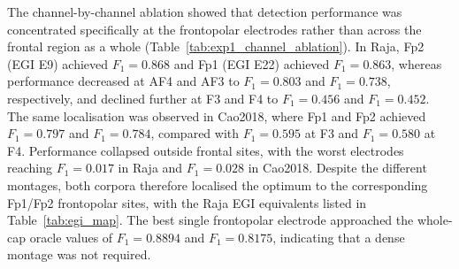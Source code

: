 The channel-by-channel ablation showed that detection performance was concentrated specifically at the frontopolar electrodes rather than across the frontal region as a whole (Table~\ref{tab:exp1_channel_ablation}). In Raja, Fp2 (EGI E9) achieved $F_1=0.868$ and Fp1 (EGI E22) achieved $F_1=0.863$, whereas performance decreased at AF4 and AF3 to $F_1=0.803$ and $F_1=0.738$, respectively, and declined further at F3 and F4 to $F_1=0.456$ and $F_1=0.452$. The same localisation was observed in Cao2018, where Fp1 and Fp2 achieved $F_1=0.797$ and $F_1=0.784$, compared with $F_1=0.595$ at F3 and $F_1=0.580$ at F4. Performance collapsed outside frontal sites, with the worst electrodes reaching $F_1=0.017$ in Raja and $F_1=0.028$ in Cao2018. Despite the different montages, both corpora therefore localised the optimum to the corresponding Fp1/Fp2 frontopolar sites, with the Raja EGI equivalents listed in Table~\ref{tab:egi_map}. The best single frontopolar electrode approached the whole-cap oracle values of $F_1=0.8894$ and $F_1=0.8175$, indicating that a dense montage was not required.
